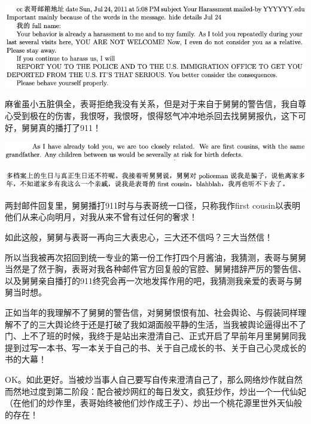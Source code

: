 \documentclass[9pt, b5paper]{article}
\begin{document}
\begin{center}
\includegraphics[width=.9\linewidth]{./pic/backups_plans_20210412_172303.png}
\end{center}

麻雀虽小五脏俱全，表哥拒绝我没有关系，但是对于来自于舅舅的警告信，我自尊心受到极在的伤害，我恨呀，我恨呀，恨得怒气冲冲地杀回去找舅舅报仇，这下可好，舅舅真的播打了911！

\begin{center}
\includegraphics[width=.9\linewidth]{./pic/backups_plans_20210412_172426.png}
\end{center}

\begin{center}
\includegraphics[width=.9\linewidth]{./pic/backups_plans_20210412_172523.png}
\end{center}

两封邮件回复里，舅舅播打911时与与表哥统一口径，只称我作first cousin以表明他们从来心向明月，对我从来不曾有过任何的奢求！

如此这般，舅舅与表哥一再向三大表忠心，三大还不信吗？三大当然信！

所以当我被再次招回到统一专业的第一份工作打四个月酱油，我猜测，表哥与舅舅当然是了然于胸，表哥对我各种邮件官方回复般的官腔、舅舅措辞严厉的警告信、以及舅舅亲自播打的911终究会再一次地发挥作用的吧，我猜测我亲爱的表哥与舅舅当时想。 

正如当年的我理解不了舅舅的警告信，对舅舅恨恨有加、社会舆论、与假装同样理解不了的三大舆论终于还是打破了我如湖面般平静的生活，当我被舆论逼得出不了门、上不了班的时候，我终于是站出来澄清自己、正式开启了早前年月里舅舅同我提到过写一本书、写一本关于自己的书、关于自己成长的书、关于自己心灵成长的书的大幕！

OK。如此更好。当被炒当事人自己要写自传来澄清自己了，那么网络炒作就自然而然地过度到第二阶段：配合被炒网红的每日发文，疯狂炒作，炒出一个一代仙妃（在他们的炒作里，表哥始终被他们炒作成王子）、炒出一个桃花源里世外天仙般的存在！
\end{document}
